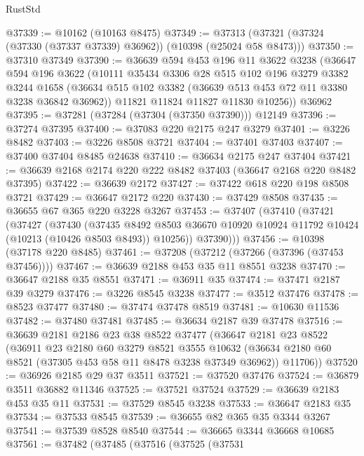 \begin{lexlean}{RustStd}
\begin{coremodule}
@37339 := @10162 (@10163 @8475)
@37349 := @37313 (@37321 (@37324 (@37330 (@37337 @37339) @36962)) (@10398 (@25024 @58 @8473)))
@37350 := @37310 @37349
@37390 := @36639
    @594
    @453
    @196
    @11
    @3622
    @3238
    (@36647
      @594
      @196
      @3622
      (@10111
        @35434
        @3306
        @28
        @515
        @102
        @196
        @3279
        @3382
        @3244
        @1658
        (@36634 @515 @102 @3382 (@36639 @513 @453 @72 @11 @3380 @3238 @36842 @36962))
        @11821
        @11824
        @11827
        @11830
        @10256))
    @36962
@37395 := @37281 (@37284 (@37304 (@37350 @37390))) @12149
@37396 := @37274 @37395
@37400 := @37083 @220 @2175 @247 @3279
@37401 := @3226 @8482
@37403 := @3226 @8508 @3721
@37404 := @37401 @37403
@37407 := @37400 @37404 @8485 @24638
@37410 := @36634 @2175 @247 @37404
@37421 := @36639 @2168 @2174 @220 @222 @8482 @37403 (@36647 @2168 @220 @8482 @37395)
@37422 := @36639 @2172
@37427 := @37422 @618 @220 @198 @8508 @3721
@37429 := @36647 @2172 @220
@37430 := @37429 @8508
@37435 := @36655 @67 @365 @220 @3228 @3267
@37453 := @37407
    (@37410
      (@37421
        (@37427
          (@37430
            (@37435
              @8492
              @8503
              @36670
              @10920
              @10924
              @11792
              @10424
              (@10213 (@10426 @8503 @8493))
              @10256))
          @37390)))
@37456 := @10398 (@37178 @220 @8485)
@37461 := @37208 (@37212 (@37266 (@37396 (@37453 @37456))))
@37467 := @36639 @2188 @453 @35 @11 @8551 @3238
@37470 := @36647 @2188 @35 @8551
@37471 := @36911 @35
@37474 := @37471 @2187 @39 @3279
@37476 := @3226 @8545 @3238
@37477 := @3512 @37476
@37478 := @8523 @37477
@37480 := @37474 @37478 @8519
@37481 := @10630 @11536
@37482 := @37480 @37481
@37485 := @36634 @2187 @39 @37478
@37516 := @36639
    @2181
    @2186
    @23
    @38
    @8522
    @37477
    (@36647
      @2181
      @23
      @8522
      (@36911
        @23
        @2180
        @60
        @3279
        @8521
        @3555
        @10632
        (@36634 @2180 @60 @8521 (@37305 @453 @58 @11 @8478 @3238 @37349 @36962))
        @11706))
@37520 := @36926 @2185 @29 @37 @3511
@37521 := @37520 @37476
@37524 := @36879 @3511 @36882 @11346
@37525 := @37521 @37524
@37529 := @36639 @2183 @453 @35 @11
@37531 := @37529 @8545 @3238
@37533 := @36647 @2183 @35
@37534 := @37533 @8545
@37539 := @36655 @82 @365 @35 @3344 @3267
@37541 := @37539 @8528 @8540
@37544 := @36665 @3344 @36668 @10685
@37561 := @37482
    (@37485
      (@37516
        (@37525
          (@37531

\end{coremodule}
\end{lexlean}

